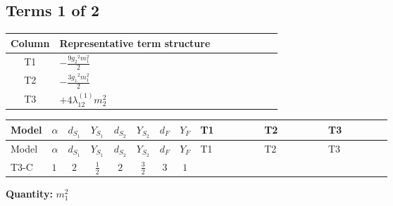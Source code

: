 \documentclass[8pt]{article}
\begin{document}
\begin{landscape}
\subsection*{Terms 1 of 2}
\begin{center}
\begin{tabular}{@{}c >{\raggedright\arraybackslash}p{0.82\linewidth}@{}}
\toprule
Column & Representative term structure \\
\midrule
T1 & \(\displaystyle -\frac{9 {g_2}^2 {m_1^2}}{2}\) \\
\midrule
T2 & \(\displaystyle -\frac{3 {g_1}^2 {m_1^2}}{2}\) \\
\midrule
T3 & \(\displaystyle +4 {\lambda_{12}^{(1)}} {m_2^2}\) \\
\midrule
\bottomrule
\end{tabular}
\end{center}
\smallskip
\tiny
\begin{longtable}{@{}llcccccc >{\raggedright\arraybackslash}p{0.21\linewidth} >{\raggedright\arraybackslash}p{0.21\linewidth} >{\raggedright\arraybackslash}p{0.21\linewidth}@{}}
\toprule
Model & $\alpha$ & $d_{S_1}$ & $Y_{S_1}$ & $d_{S_2}$ & $Y_{S_2}$ & $d_F$ & $Y_F$ & T1 & T2 & T3 \\
\midrule
\endfirsthead
\toprule
Model & $\alpha$ & $d_{S_1}$ & $Y_{S_1}$ & $d_{S_2}$ & $Y_{S_2}$ & $d_F$ & $Y_F$ & T1 & T2 & T3 \\
\midrule
\endhead
T3-C & $1$ & $2$ & $\frac{1}{2}$ & $2$ & $\frac{3}{2}$ & $3$ & $1$ & \scriptsize\adjustbox{max width=\linewidth}{$\begin{gathered} -\frac{9 {g_2}^2 {m_1^2}}{2}\end{gathered}$} & \scriptsize\adjustbox{max width=\linewidth}{$\begin{gathered} -\frac{3 {g_1}^2 {m_1^2}}{2}\end{gathered}$} & \scriptsize\adjustbox{max width=\linewidth}{$\begin{gathered} +4 {\lambda_{12}^{(1)}} {m_2^2}\end{gathered}$} \\
\midrule
\bottomrule
\end{longtable}
\clearpage
\noindent\textbf{Quantity: }$m_1^2$\par\smallskip

\end{landscape}
\end{document}
